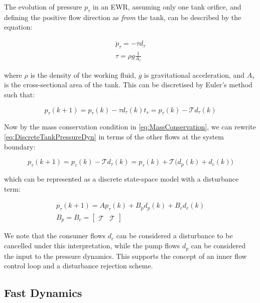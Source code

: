 The evolution of pressure $p_\tau$ in an EWR, assuming only one tank orifice, and defining the positive flow direction as \textit{from} the tank, can be described \cite{Kallesoe2017} by the equation:

\begin{gather}\label{eq:TankPressureDyn}
	\dot{p}_\tau = -\tau d_\tau
	\\ \tau = \rho g \frac{1}{A_\tau}
\end{gather}

where $\rho$ is the density of the working fluid, $g$ is gravitational acceleration, and $A_\tau$ is the cross-sectional area of the tank. This can be discretised by Euler's method such that:

\begin{equation}\label{eq:DiscreteTankPressureDyn}
	p_\tau(k+1) = p_\tau(k) - \tau d_\tau(k)t_s =  p_\tau(k) - \mathcal{T} d_\tau(k)
\end{equation}

Now by the mass conservation condition in \cref{eq:MassConservation}, we can rewrite \cref{eq:DiscreteTankPressureDyn} in terms of the other flows at the system boundary:

\begin{equation}\label{eq:DiscreteTankPressureDynConProd}
	p_\tau(k+1) = p_\tau(k) - \mathcal{T} d_\tau(k) = p_\tau(k) + \mathcal{T} \Big(d_p(k) + d_c(k)\Big)
\end{equation}

which can be represented as a discrete state-space model with a disturbance term:

\begin{equation}\label{eq:DiscreteTankPressureStateSpace}
	\begin{gathered}
	p_\tau(k+1) = Ap_\tau(k) + B_p d_p(k) + B_cd_c(k) \\ B_p = B_c = \begin{bmatrix}\mathcal{T} & \mathcal{T} \end{bmatrix}
	\end{gathered}
\end{equation}

We note that the consumer flows $d_c$ can be considered a disturbance to be cancelled under this interpretation, while the pump flows $d_p$ can be considered the input to the pressure dynamics. This supports the concept of an inner flow control loop and a disturbance rejection scheme.

\subsection{Fast Dynamics}\label{subsec:FastDynamics}

